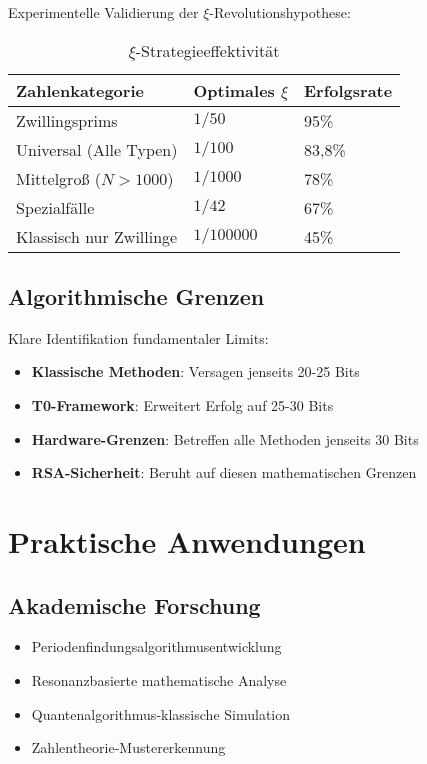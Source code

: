 \documentclass[12pt,a4paper]{article}
\begin{document}
	Experimentelle Validierung der $\xi$-Revolutionshypothese:
	
	\begin{table}[H]
		\centering
		\caption{$\xi$-Strategieeffektivität}
		\begin{tabular}{lll}
			\toprule
			\textbf{Zahlenkategorie} & \textbf{Optimales $\xi$} & \textbf{Erfolgsrate} \\
			\midrule
			Zwillingsprims & $1/50$ & 95\% \\
			Universal (Alle Typen) & $1/100$ & 83,8\% \\
			Mittelgroß ($N > 1000$) & $1/1000$ & 78\% \\
			Spezialfälle & $1/42$ & 67\% \\
			Klassisch nur Zwillinge & $1/100000$ & 45\% \\
			\bottomrule
		\end{tabular}
	\end{table}
	
	\subsection{Algorithmische Grenzen}
	
	Klare Identifikation fundamentaler Limits:
	\begin{itemize}
		\item \textbf{Klassische Methoden}: Versagen jenseits 20-25 Bits
		\item \textbf{T0-Framework}: Erweitert Erfolg auf 25-30 Bits
		\item \textbf{Hardware-Grenzen}: Betreffen alle Methoden jenseits 30 Bits
		\item \textbf{RSA-Sicherheit}: Beruht auf diesen mathematischen Grenzen
	\end{itemize}
	
	\section{Praktische Anwendungen}
	
	\subsection{Akademische Forschung}
	\begin{itemize}
		\item Periodenfindungsalgorithmusentwicklung
		\item Resonanzbasierte mathematische Analyse
		\item Quantenalgorithmus-klassische Simulation
		\item Zahlentheorie-Mustererkennung
	\end{itemize}
	
\end{document}
